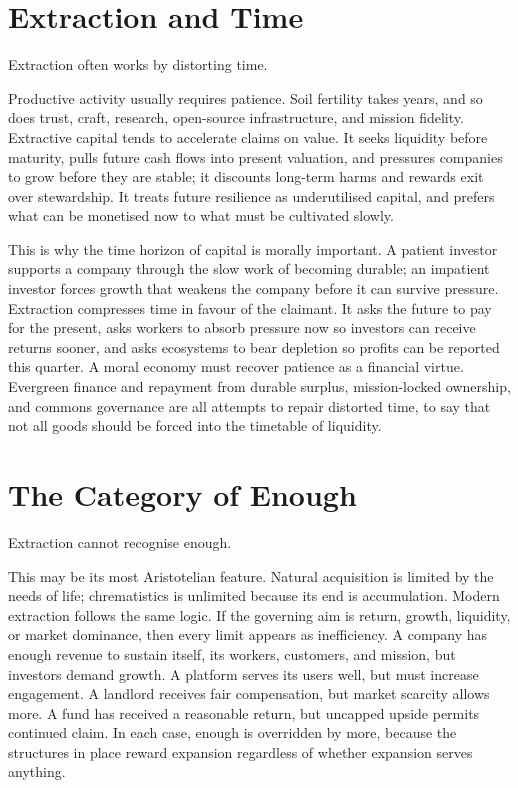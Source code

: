 \documentclass[11pt,a4paper,oneside]{book}
\begin{document}
\section*{Extraction and Time}

Extraction often works by distorting time.

Productive activity usually requires patience. Soil fertility takes years, and so does trust, craft, research, open-source infrastructure, and mission fidelity. Extractive capital tends to accelerate claims on value. It seeks liquidity before maturity, pulls future cash flows into present valuation, and pressures companies to grow before they are stable; it discounts long-term harms and rewards exit over stewardship. It treats future resilience as underutilised capital, and prefers what can be monetised now to what must be cultivated slowly.

This is why the time horizon of capital is morally important. A patient investor supports a company through the slow work of becoming durable; an impatient investor forces growth that weakens the company before it can survive pressure. Extraction compresses time in favour of the claimant. It asks the future to pay for the present, asks workers to absorb pressure now so investors can receive returns sooner, and asks ecosystems to bear depletion so profits can be reported this quarter. A moral economy must recover patience as a financial virtue. Evergreen finance and repayment from durable surplus, mission-locked ownership, and commons governance are all attempts to repair distorted time, to say that not all goods should be forced into the timetable of liquidity.

\section*{The Category of Enough}

Extraction cannot recognise enough.

This may be its most Aristotelian feature. Natural acquisition is limited by the needs of life; chrematistics is unlimited because its end is accumulation. Modern extraction follows the same logic. If the governing aim is return, growth, liquidity, or market dominance, then every limit appears as inefficiency. A company has enough revenue to sustain itself, its workers, customers, and mission, but investors demand growth. A platform serves its users well, but must increase engagement. A landlord receives fair compensation, but market scarcity allows more. A fund has received a reasonable return, but uncapped upside permits continued claim. In each case, enough is overridden by more, because the structures in place reward expansion regardless of whether expansion serves anything.
\end{document}
